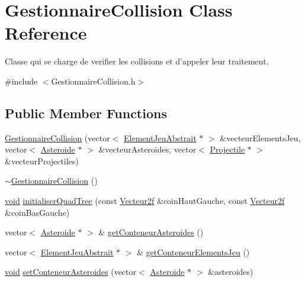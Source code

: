 \hypertarget{class_gestionnaire_collision}{\section{Gestionnaire\-Collision Class Reference}
\label{class_gestionnaire_collision}
}


Classe qui se charge de verifier les collisions et d'appeler leur traitement.  




{\ttfamily \#include $<$Gestionnaire\-Collision.\-h$>$}

\subsection*{Public Member Functions}
\begin{DoxyCompactItemize}
\item 
\hyperlink{group__inf2990_ga9df084bfa2dc4442d976654973ee5372}{Gestionnaire\-Collision} (vector$<$ \hyperlink{class_element_jeu_abstrait}{Element\-Jeu\-Abstrait} $\ast$ $>$ \&vecteur\-Elements\-Jeu, vector$<$ \hyperlink{class_asteroide}{Asteroide} $\ast$ $>$ \&vecteur\-Asteroides, vector$<$ \hyperlink{class_projectile}{Projectile} $\ast$ $>$ \&vecteur\-Projectiles)
\item 
\hyperlink{group__inf2990_ga32cdb2d1f023ff9698249fcbaa5f7dc8}{$\sim$\-Gestionnaire\-Collision} ()
\item 
\hyperlink{wglew_8h_aeea6e3dfae3acf232096f57d2d57f084}{void} \hyperlink{group__inf2990_ga2243af30a36d7db008ec99ce8e8f74b6}{initialiser\-Quad\-Tree} (const \hyperlink{group__utilitaire_ga606b191c0b0bbb868ae25c13b906f45a}{Vecteur2f} \&coin\-Haut\-Gauche, const \hyperlink{group__utilitaire_ga606b191c0b0bbb868ae25c13b906f45a}{Vecteur2f} \&coin\-Bas\-Gauche)
\item 
vector$<$ \hyperlink{class_asteroide}{Asteroide} $\ast$ $>$ \& \hyperlink{group__inf2990_ga572a2a95fc9137f44e0a5ce8c6ab0648}{get\-Conteneur\-Asteroides} ()
\item 
vector$<$ \hyperlink{class_element_jeu_abstrait}{Element\-Jeu\-Abstrait} $\ast$ $>$ \& \hyperlink{group__inf2990_gacc26b8c32b6c1bdeb1ded2e69e427ffc}{get\-Conteneur\-Elements\-Jeu} ()
\item 
\hyperlink{wglew_8h_aeea6e3dfae3acf232096f57d2d57f084}{void} \hyperlink{group__inf2990_ga3de2ac60f6d74d60c8015f7fba0c6194}{set\-Conteneur\-Asteroides} (vector$<$ \hyperlink{class_asteroide}{Asteroide} $\ast$ $>$ \&asteroides)
\item 

\end{DoxyCompactItemize}
